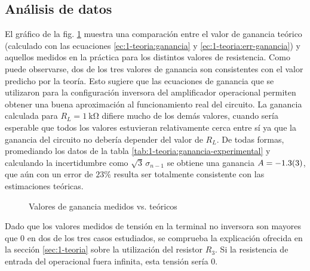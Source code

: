 \subsection{Análisis de datos}

El gráfico de la fig. \ref{fig:1-analisis:ganancia} muestra una comparación
entre el valor de ganancia teórico (calculado con las ecuaciones 
\ref{ec:1-teoria:ganancia} y \ref{ec:1-teoria:err-ganancia}) y aquellos 
medidos en la práctica para los distintos valores de resistencia. Como puede
observarse, dos de los tres valores de ganancia son consistentes con el valor
predicho por la teoría. Esto sugiere que las ecuaciones de ganancia
que se utilizaron para la configuración inversora del amplificador operacional
permiten obtener una buena aproximación al funcionamiento real del circuito.
La ganancia calculada para $R_L = \SI{1}{\kilo\ohm}$ difiere mucho
de los demás valores, cuando sería esperable que todos los valores estuvieran
relativamente cerca entre sí ya que la ganancia del circuito no debería
depender del valor de $R_L$. De todas formas, promediando los datos de la tabla
\ref{tab:1-teoria:ganancia-experimental} y calculando la incertidumbre como
$\sqrt{3}\,\sigma_{n-1}$ se obtiene una ganancia
$A = \num{-1.3 \pm 0.3}$, que aún con un error de $23\%$ resulta ser 
totalmente consistente con las estimaciones teóricas.

\begin{figure}[H]
    \centering
    
    \caption{Valores de ganancia medidos vs. teóricos}
    \label{fig:1-analisis:ganancia}
\end{figure}

Dado que los valores medidos de tensión en la terminal no inversora son
mayores que $0$ en dos de los tres casos estudiados, se comprueba la
explicación ofrecida en la sección \ref{sec:1-teoria} sobre la
utilización del resistor $R_3$. Si la resistencia de entrada del operacional
fuera infinita, esta tensión sería 0.
